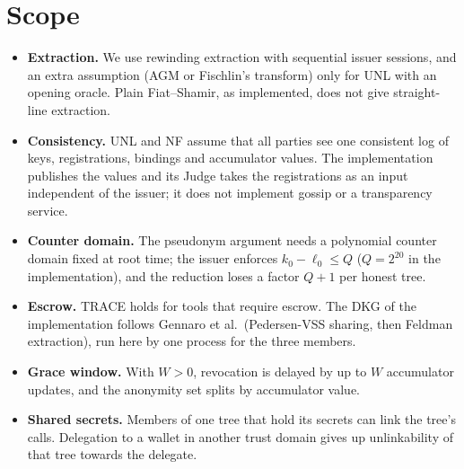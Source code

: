 \section{Scope}\label{s:scope}
\begin{itemize}[leftmargin=*]
\item \textbf{Extraction.} We use rewinding extraction with sequential issuer sessions, and an extra assumption (AGM or Fischlin's transform) only for UNL with an opening oracle. Plain Fiat--Shamir, as implemented, does not give straight-line extraction.
\item \textbf{Consistency.} UNL and NF assume that all parties see one consistent log of keys, registrations, bindings and accumulator values. The implementation publishes the values and its Judge takes the registrations as an input independent of the issuer; it does not implement gossip or a transparency service.
\item \textbf{Counter domain.} The pseudonym argument needs a polynomial counter domain fixed at root time; the issuer enforces $k_0-\ell_0\le Q$ ($Q=2^{20}$ in the implementation), and the reduction loses a factor $Q+1$ per honest tree.
\item \textbf{Escrow.} TRACE holds for tools that require escrow. The DKG of the implementation follows Gennaro et al.\ (Pedersen-VSS sharing, then Feldman extraction), run here by one process for the three members.
\item \textbf{Grace window.} With $W>0$, revocation is delayed by up to $W$ accumulator updates, and the anonymity set splits by accumulator value.
\item \textbf{Shared secrets.} Members of one tree that hold its secrets can link the tree's calls. Delegation to a wallet in another trust domain gives up unlinkability of that tree towards the delegate.
\end{itemize}

